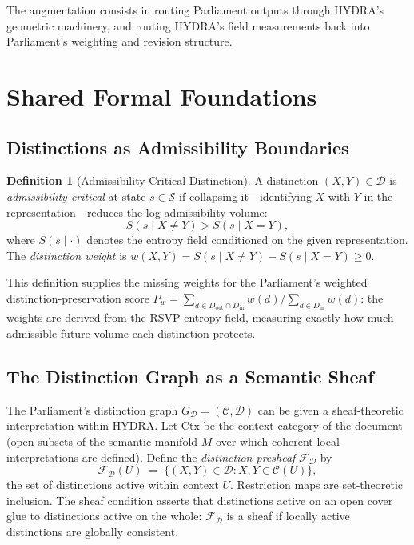 \documentclass[12pt, a4paper]{article}
\theoremstyle{plain}
\theoremstyle{definition}
\newtheorem{definition}{Definition}
\theoremstyle{remark}
\begin{document}
The augmentation consists in routing Parliament outputs through HYDRA's
geometric machinery, and routing HYDRA's field measurements back into
Parliament's weighting and revision structure.

\section{Shared Formal Foundations}
\label{sec:foundations}

\subsection{Distinctions as Admissibility Boundaries}

\begin{definition}[Admissibility-Critical Distinction]
A distinction $(X, Y) \in \mathcal{D}$ is \emph{admissibility-critical} at state $s \in \mathcal{S}$ if collapsing it---identifying $X$ with $Y$ in the representation---reduces the log-admissibility volume:
\[
S(s \mid X \neq Y) > S(s \mid X = Y),
\]
where $S(s \mid \cdot)$ denotes the entropy field conditioned on the given representation. The \emph{distinction weight} is $w(X,Y) = S(s \mid X \neq Y) - S(s \mid X = Y) \geq 0$.
\end{definition}

This definition supplies the missing weights for the Parliament's weighted
distinction-preservation score $P_w = \sum_{d \in D_\mathrm{out} \cap D_\mathrm{in}} w(d) \big/ \sum_{d \in D_\mathrm{in}} w(d)$: the weights are derived from the RSVP entropy field, measuring exactly how much admissible future volume each distinction protects.

\subsection{The Distinction Graph as a Semantic Sheaf}

The Parliament's distinction graph $G_\mathcal{D} = (\mathcal{C}, \mathcal{D})$ can be given a sheaf-theoretic interpretation within HYDRA. Let $\mathrm{Ctx}$ be the context category of the document (open subsets of the semantic manifold $M$ over which coherent local interpretations are defined). Define the \emph{distinction presheaf} $\mathcal{F}_\mathcal{D}$ by
\[
\mathcal{F}_\mathcal{D}(U) \;=\; \bigl\{ (X,Y) \in \mathcal{D} : X, Y \in \mathcal{C}(U) \bigr\},
\]
the set of distinctions active within context $U$. Restriction maps are set-theoretic inclusion. The sheaf condition asserts that distinctions active on an open cover glue to distinctions active on the whole: $\mathcal{F}_\mathcal{D}$ is a sheaf if locally active distinctions are globally consistent.
\end{document}
